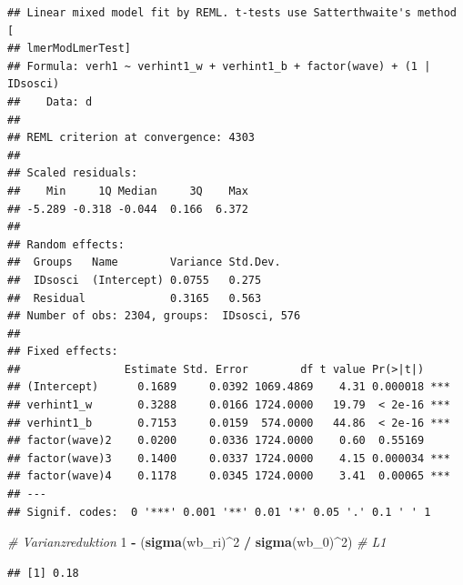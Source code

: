 \documentclass[
]{book}
\newenvironment{Shaded}{\begin{snugshade}}{\end{snugshade}}
\newcommand{\CommentTok}[1]{\textcolor[rgb]{0.56,0.35,0.01}{\textit{#1}}}
\newcommand{\DecValTok}[1]{\textcolor[rgb]{0.00,0.00,0.81}{#1}}
\newcommand{\KeywordTok}[1]{\textcolor[rgb]{0.13,0.29,0.53}{\textbf{#1}}}
\newcommand{\NormalTok}[1]{#1}
\newcommand{\OperatorTok}[1]{\textcolor[rgb]{0.81,0.36,0.00}{\textbf{#1}}}
\newcommand{\StringTok}[1]{\textcolor[rgb]{0.31,0.60,0.02}{#1}}
\begin{document}
\begin{verbatim}
## Linear mixed model fit by REML. t-tests use Satterthwaite's method [
## lmerModLmerTest]
## Formula: verh1 ~ verhint1_w + verhint1_b + factor(wave) + (1 | IDsosci)
##    Data: d
## 
## REML criterion at convergence: 4303
## 
## Scaled residuals: 
##    Min     1Q Median     3Q    Max 
## -5.289 -0.318 -0.044  0.166  6.372 
## 
## Random effects:
##  Groups   Name        Variance Std.Dev.
##  IDsosci  (Intercept) 0.0755   0.275   
##  Residual             0.3165   0.563   
## Number of obs: 2304, groups:  IDsosci, 576
## 
## Fixed effects:
##                Estimate Std. Error        df t value Pr(>|t|)    
## (Intercept)      0.1689     0.0392 1069.4869    4.31 0.000018 ***
## verhint1_w       0.3288     0.0166 1724.0000   19.79  < 2e-16 ***
## verhint1_b       0.7153     0.0159  574.0000   44.86  < 2e-16 ***
## factor(wave)2    0.0200     0.0336 1724.0000    0.60  0.55169    
## factor(wave)3    0.1400     0.0337 1724.0000    4.15 0.000034 ***
## factor(wave)4    0.1178     0.0345 1724.0000    3.41  0.00065 ***
## ---
## Signif. codes:  0 '***' 0.001 '**' 0.01 '*' 0.05 '.' 0.1 ' ' 1
\end{verbatim}

\begin{Shaded}
\begin{Highlighting}[]
\CommentTok{# Varianzreduktion}
\DecValTok{1} \OperatorTok{-}\StringTok{ }\NormalTok{(}\KeywordTok{sigma}\NormalTok{(wb_ri)}\OperatorTok{^}\DecValTok{2} \OperatorTok{/}\StringTok{ }\KeywordTok{sigma}\NormalTok{(wb_}\DecValTok{0}\NormalTok{)}\OperatorTok{^}\DecValTok{2}\NormalTok{) }\CommentTok{# L1}
\end{Highlighting}
\end{Shaded}

\begin{verbatim}
## [1] 0.18
\end{verbatim}

\begin{Shaded}
\end{Shaded}
\end{document}
